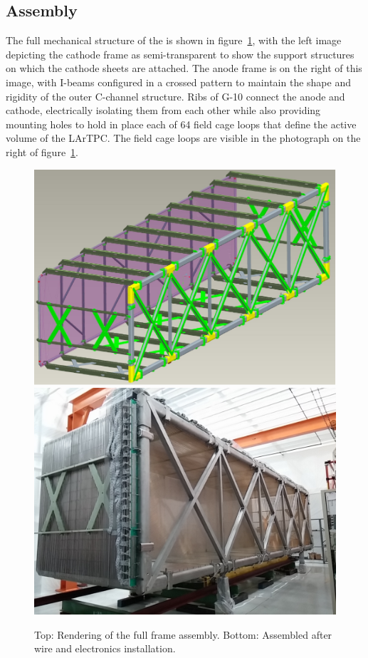 \subsection{Assembly}
\label{sec:assembly}

The full mechanical structure of the \lartpc is shown in figure~\ref{fig:tpc-full}, with the left image depicting the cathode frame as semi-transparent to show the support structures on which the cathode sheets are attached. The anode frame is on the right of this image, with I-beams configured in a crossed pattern to maintain the shape and rigidity of the outer C-channel structure. Ribs of G-10 connect the anode and cathode, electrically isolating them from each other while also providing mounting holes to hold in place each of 64 field cage loops that define the active volume of the LArTPC.  The field cage loops are visible in the photograph on the right of figure~\ref{fig:tpc-full}.

\begin{figure}
\centering	
\includegraphics[width=0.48\linewidth]{figures/tpc-3drendering.pdf}
\includegraphics[width=0.48\linewidth]{figures/tpc-completed-upstream-right.jpg}
\caption{Top: Rendering of the full \lartpc frame assembly.  Bottom: Assembled \lartpc after wire and electronics installation.}
\label{fig:tpc-full}
\end{figure}

